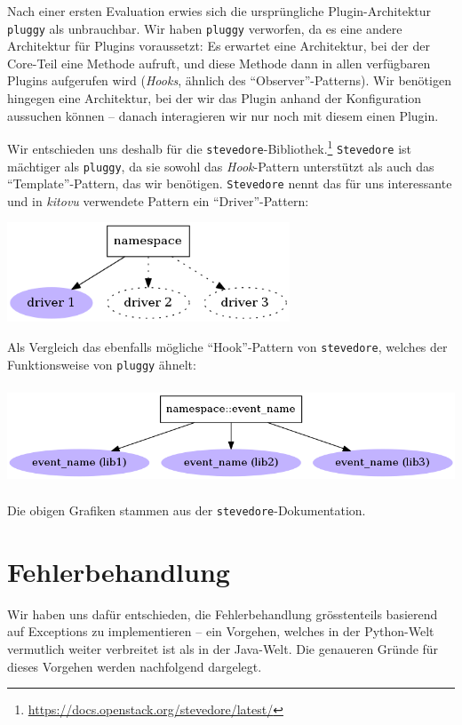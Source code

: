 \documentclass[a4paper]{article}
\let\oldsection\section
\renewcommand\section{\clearpage\oldsection}
\begin{document}
Nach einer ersten Evaluation erwies sich die ursprüngliche Plugin-Architektur \verb|pluggy| als unbrauchbar. Wir haben \verb|pluggy| verworfen, da es eine andere Architektur für Plugins
voraussetzt: Es erwartet eine Architektur, bei der der
Core-Teil eine Methode aufruft, und diese Methode dann in allen verfügbaren
Plugins aufgerufen wird (\emph{Hooks}, ähnlich des ``Observer''-Patterns). Wir benötigen hingegen eine Architektur, bei der wir das Plugin anhand der Konfiguration aussuchen können -- danach interagieren wir nur noch mit diesem einen Plugin.

Wir entschieden uns deshalb für die \verb|stevedore|-Bibliothek.\footnote{\url{https://docs.openstack.org/stevedore/latest/}} \verb|Stevedore| ist mächtiger als \verb|pluggy|, da sie sowohl das \emph{Hook}-Pattern unterstützt als auch das ``Template''-Pattern, das wir benötigen. \verb|Stevedore| nennt das für uns interessante und in \emph{kitovu} verwendete Pattern ein ``Driver''-Pattern: \\

\begin{center}
	\includegraphics[height=8em]{img/stevedore_driver.png}
\end{center}

Als Vergleich das ebenfalls mögliche ``Hook''-Pattern von \verb|stevedore|, welches der
Funktionsweise von \verb|pluggy| ähnelt:

\begin{center}
	\includegraphics[height=8em]{img/stevedore_hooks.png}
\end{center}

Die obigen Grafiken stammen aus der \verb|stevedore|-Dokumentation.

\section{Fehlerbehandlung}
Wir haben uns dafür entschieden, die Fehlerbehandlung grösstenteils basierend
auf Exceptions zu implementieren -- ein Vorgehen, welches in der Python-Welt
vermutlich weiter verbreitet ist als in der Java-Welt. Die genaueren Gründe für
dieses Vorgehen werden nachfolgend dargelegt.
\end{document}
